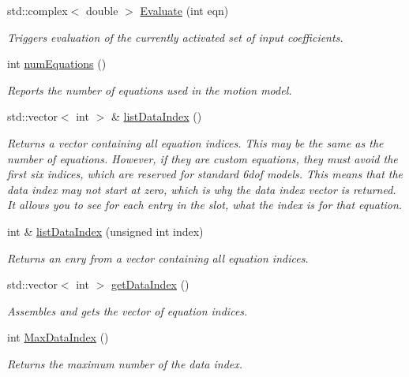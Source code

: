 \begin{DoxyCompactItemize}
std\-::complex$<$ double $>$ \hyperlink{classosea_1_1ofreq_1_1_motion_model_a331d96a45df8ca0911fc4610705c3a30}{Evaluate} (int eqn)
\begin{DoxyCompactList}\small\item\em Triggers evaluation of the currently activated set of input coefficients. \end{DoxyCompactList}\item 
int \hyperlink{classosea_1_1ofreq_1_1_motion_model_a0a228c24a524e2a1c6636d3121a842be}{num\-Equations} ()
\begin{DoxyCompactList}\small\item\em Reports the number of equations used in the motion model. \end{DoxyCompactList}\item 
std\-::vector$<$ int $>$ \& \hyperlink{classosea_1_1ofreq_1_1_motion_model_af9e72eac109b2d1bff50bb8759f113c3}{list\-Data\-Index} ()
\begin{DoxyCompactList}\small\item\em Returns a vector containing all equation indices. This may be the same as the number of equations. However, if they are custom equations, they must avoid the first six indices, which are reserved for standard 6dof models. This means that the data index may not start at zero, which is why the data index vector is returned. It allows you to see for each entry in the slot, what the index is for that equation. \end{DoxyCompactList}\item 
int \& \hyperlink{classosea_1_1ofreq_1_1_motion_model_ab9c11dbb141ed78daa137d562b4409a7}{list\-Data\-Index} (unsigned int index)
\begin{DoxyCompactList}\small\item\em Returns an enry from a vector containing all equation indices. \end{DoxyCompactList}\item 
std\-::vector$<$ int $>$ \hyperlink{classosea_1_1ofreq_1_1_motion_model_a19f38af161556e9e5b79cdf6a4ff39bb}{get\-Data\-Index} ()
\begin{DoxyCompactList}\small\item\em Assembles and gets the vector of equation indices. \end{DoxyCompactList}\item 
int \hyperlink{classosea_1_1ofreq_1_1_motion_model_a81ed21162a09ffce06043f3a7fb4213d}{Max\-Data\-Index} ()
\begin{DoxyCompactList}\small\item\em Returns the maximum number of the data index. \end{DoxyCompactList}\item 

\end{DoxyCompactItemize}
